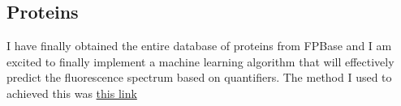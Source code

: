 \documentclass{article}
\begin{document}
\subsection{Proteins}
I have finally obtained the entire database of proteins from FPBase and I am excited to finally implement a machine learning algorithm that will effectively predict the fluorescence spectrum based on quantifiers. The method I used to achieved this was \href{https://www.fpbase.org/graphql/#query=\%7B\%0A\%09proteins\%7B%0A%20%20%20%20id%0A%20%20%20%20seq%0A%20%20%20%20pdb%0A%20%20%20%20name%0A%20%20%20%20states%7B%0A%20%20%20%20%20%20name%0A%20%20%20%20%20%20slug%0A%20%20%20%20%20%20emMax%0A%20%20%20%20%20%20exMax%0A%20%20%20%20%20%20spectra%7B%0A%20%20%20%20%20%20%20%20subtype%0A%20%20%20%20%20%20%20%20data%0A%20%20%20%20%20%20%7D%0A%20%20%20%20%7D%0A%20%20%7D%0A%7D}{this link}
\end{document}
